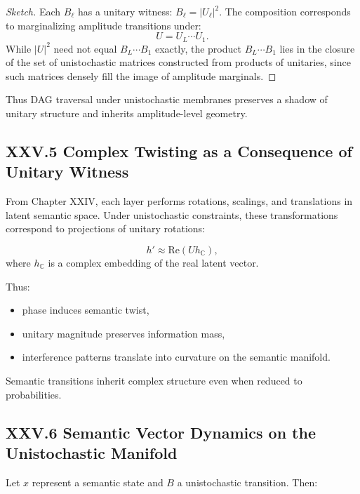 \documentclass[11pt,letterpaper]{article}
\begin{document}
\begin{proof}[Sketch]
Each $B_\ell$ has a unitary witness: $B_\ell = |U_\ell|^2$.  
The composition corresponds to marginalizing amplitude transitions under:
\[
U = U_L \cdots U_1.
\]
While $|U|^2$ need not equal $B_L \cdots B_1$ exactly, the product $B_L \cdots B_1$ lies in the closure of the set of unistochastic matrices constructed from products of unitaries, since such matrices densely fill the image of amplitude marginals.  
\end{proof}

Thus DAG traversal under unistochastic membranes preserves a shadow of unitary structure and inherits amplitude-level geometry.

\subsection{XXV.5 Complex Twisting as a Consequence of Unitary Witness}

From Chapter XXIV, each layer performs rotations, scalings, and translations in latent semantic space. Under unistochastic constraints, these transformations correspond to projections of unitary rotations:

\[
h' \approx \mathrm{Re}(U h_{\mathbb{C}}),
\]
where $h_{\mathbb{C}}$ is a complex embedding of the real latent vector.

Thus:

\begin{itemize}
    \item phase induces semantic twist,
    \item unitary magnitude preserves information mass,
    \item interference patterns translate into curvature on the semantic manifold.
\end{itemize}

Semantic transitions inherit complex structure even when reduced to probabilities.

\subsection{XXV.6 Semantic Vector Dynamics on the Unistochastic Manifold}

Let $x$ represent a semantic state and $B$ a unistochastic transition. Then:
\end{document}
